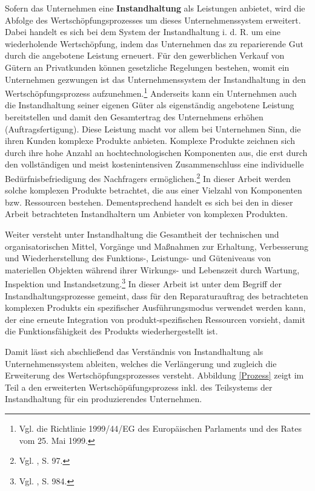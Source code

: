 Sofern das Unternehmen eine \textbf{Instandhaltung} als Leistungen anbietet, wird die Abfolge des Wertschöpfungsprozesses um dieses Unternehmenssystem erweitert. Dabei handelt es sich bei dem System der Instandhaltung i. d. R. um eine wiederholende Wertschöpfung, indem das Unternehmen das zu reparierende Gut durch die angebotene Leistung erneuert. Für den gewerblichen Verkauf von Gütern an Privatkunden können gesetzliche Regelungen bestehen, womit ein Unternehmen gezwungen ist das Unternehmenssystem der Instandhaltung in den Wertschöpfungsprozess aufzunehmen.\footnote{Vgl. die Richtlinie 1999/44/EG des Europäischen Parlaments und des Rates vom 25. Mai 1999.} Anderseits kann ein Unternehmen auch die Instandhaltung seiner eigenen Güter als eigenständig angebotene Leistung bereitstellen und damit den Gesamtertrag des Unternehmens erhöhen (Auftragsfertigung). Diese Leistung macht vor allem bei Unternehmen Sinn, die ihren Kunden komplexe Produkte anbieten. Komplexe Produkte zeichnen sich durch ihre hohe Anzahl an hochtechnologischen Komponenten aus, die erst durch den vollständigen und meist kostenintensiven Zusammenschluss eine individuelle Bedürfnisbefriedigung des Nachfragers ermöglichen.\footnote{Vgl. \cite{komplexe2009Schmidt}, S. 97.} In dieser Arbeit werden solche komplexen Produkte betrachtet, die aus einer Vielzahl von Komponenten bzw. Ressourcen bestehen. Dementsprechend handelt es sich bei den in dieser Arbeit betrachteten Instandhaltern um Anbieter von komplexen Produkten. 

Weiter versteht \citeauthor{helbing2010instandhaltung} unter Instandhaltung die \glqq Gesamtheit der technischen und organisatorischen Mittel, Vorgänge und Maßnahmen zur Erhaltung, Verbesserung und Wiederherstellung des Funktions-, Leistungs- und Güteniveaus von materiellen Objekten während ihrer Wirkungs- und Lebenszeit durch Wartung, Inspektion und Instandsetzung.\grqq\footnote{Vgl. \citeauthor{helbing2010instandhaltung}, S. 984.} In dieser Arbeit ist unter dem Begriff der Instandhaltungsprozesse gemeint, dass für den Reparaturauftrag des betrachteten komplexen Produkts ein spezifischer Ausführungsmodus verwendet werden kann, der eine erneute Integration von produkt-spezifischen Ressourcen vorsieht, damit die Funktionsfähigkeit des Produkts wiederhergestellt ist. 

Damit lässt sich abschließend das Verständnis von Instandhaltung als Unternehmenssystem ableiten, welches die Verlängerung und zugleich die Erweiterung des Wertschöpfungsprozesses versteht. Abbildung \ref{Prozess} zeigt im Teil a den erweiterten Wertschöpüfungsprozess inkl. des Teilsystems der Instandhaltung für ein produzierendes Unternehmen.

